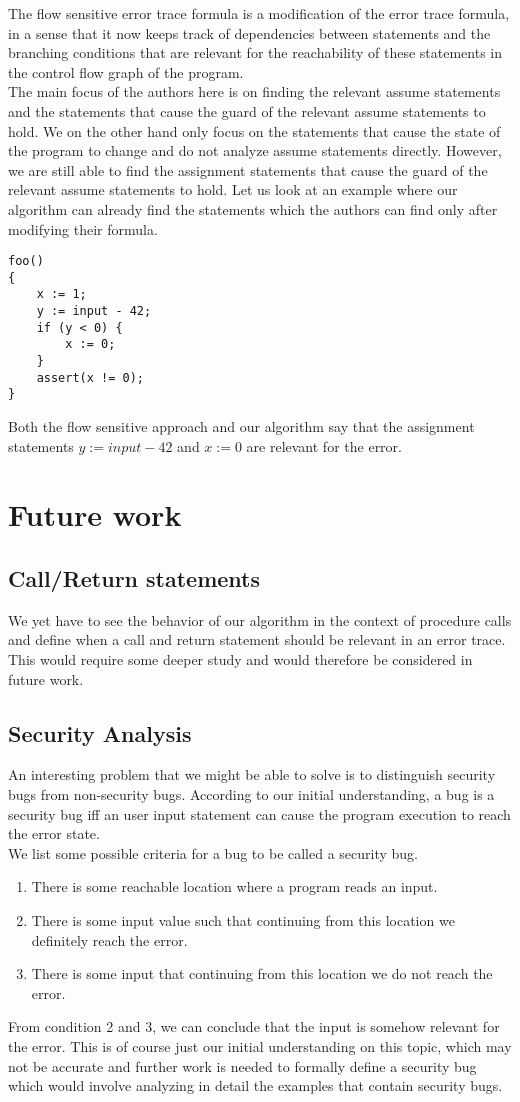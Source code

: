 \documentclass{article}
\begin{document}
The flow sensitive error trace formula is a modification of the error trace formula, in a sense that it now keeps track of dependencies between statements and the branching conditions that are relevant for the reachability of these statements in the control flow graph of the program. \\
The main focus of the authors here is on finding the relevant assume statements and the statements that cause the guard of the relevant assume statements to hold. We on the other hand only focus on the statements that cause the state of the program to change and do not analyze assume statements directly. However, we are still able to find the assignment statements that cause the guard of the relevant assume statements to hold. Let us look at an example where our algorithm can already find the statements which the authors can find only after modifying their formula. 
\begin{lstlisting}
foo()
{
	x := 1;
	y := input - 42;
	if (y < 0) {
		x := 0;	
	}
	assert(x != 0);
}
\end{lstlisting}
Both the flow sensitive approach and our algorithm say that the assignment statements $y := input - 42$ and $x := 0$ are relevant for the error.
\section{Future work}
\subsection{Call/Return statements}
We yet have to see the behavior of our algorithm in the context of procedure calls and define when a call and return statement should be relevant in an error trace. This would require some deeper study and would therefore be considered in future work.
\subsection{Security Analysis}
An interesting problem that we might be able to solve is to distinguish security bugs from non-security bugs. According to our initial understanding, a bug is a security bug iff an user input statement can cause the program execution to reach the error state. \\
We list some possible criteria for a bug to be called a security bug.
\begin{enumerate}
  \item There  is some reachable location where a program reads an input.
  \item There is some input value such that continuing from this location we definitely reach the error.
  \item There is some input that continuing from this location we do not reach the error.
\end{enumerate}
From condition 2 and 3, we can conclude that the input is somehow relevant for the error. This is of course just our initial understanding on this topic, which may not be accurate and further work is needed to formally define a security bug which would involve analyzing in detail the examples that contain security bugs.
\newpage


\end{document}
